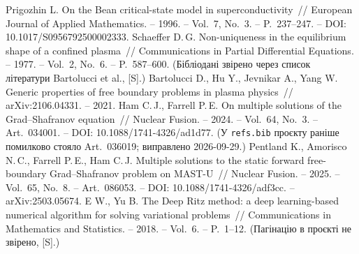  Prigozhin L. On the Bean critical-state model in superconductivity~//
  European Journal of Applied Mathematics. -- 1996. -- Vol.~7, No.~3. -- P.~237--247. --
  DOI: 10.1017/S0956792500002333.
 Schaeffer D.\,G. Non-uniqueness in the equilibrium shape of a confined
  plasma~// Communications in Partial Differential Equations. -- 1977. -- Vol.~2, No.~6. --
  P.~587--600. (Бібліодані звірено через список літератури Bartolucci et al., [S].)
 Bartolucci D., Hu Y., Jevnikar A., Yang W. Generic properties of free
  boundary problems in plasma physics~// arXiv:2106.04331. -- 2021.
 Ham C.\,J., Farrell P.\,E. On multiple solutions of the
  Grad--Shafranov equation~// Nuclear Fusion. -- 2024. -- Vol.~64, No.~3. -- Art.~034001. --
  DOI: 10.1088/1741-4326/ad1d77. (У \texttt{refs.bib} проєкту раніше помилково стояло Art.~036019; виправлено 2026-09-29.)
 Pentland K., Amorisco N.\,C., Farrell P.\,E., Ham C.\,J. Multiple
  solutions to the static forward free-boundary Grad--Shafranov problem on MAST-U~// Nuclear
  Fusion. -- 2025. -- Vol.~65, No.~8. -- Art.~086053. -- DOI: 10.1088/1741-4326/adf3cc. -- arXiv:2503.05674.
 E W., Yu B. The Deep Ritz method: a deep learning-based numerical algorithm
  for solving variational problems~// Communications in Mathematics and Statistics. -- 2018. --
  Vol.~6. -- P.~1--12. (Пагінацію в проєкті не звірено, [S].)
